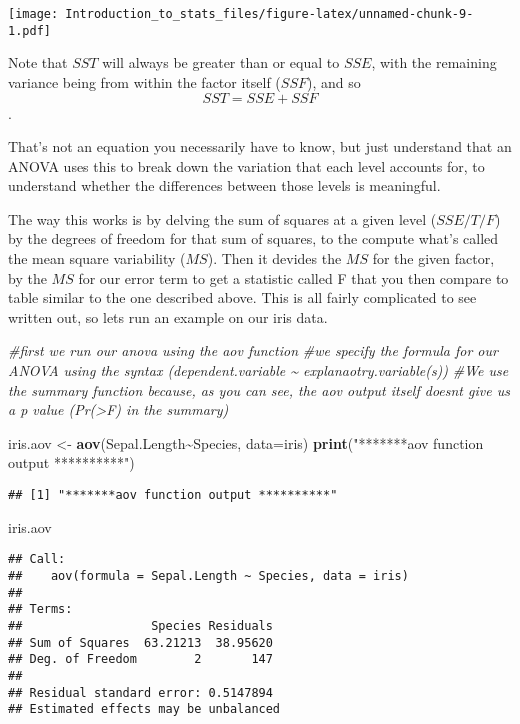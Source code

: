 \documentclass[
]{article}
\newenvironment{Shaded}{\begin{snugshade}}{\end{snugshade}}
\newcommand{\CommentTok}[1]{\textcolor[rgb]{0.56,0.35,0.01}{\textit{#1}}}
\newcommand{\DataTypeTok}[1]{\textcolor[rgb]{0.13,0.29,0.53}{#1}}
\newcommand{\KeywordTok}[1]{\textcolor[rgb]{0.13,0.29,0.53}{\textbf{#1}}}
\newcommand{\NormalTok}[1]{#1}
\newcommand{\OperatorTok}[1]{\textcolor[rgb]{0.81,0.36,0.00}{\textbf{#1}}}
\newcommand{\StringTok}[1]{\textcolor[rgb]{0.31,0.60,0.02}{#1}}
\begin{document}
\texttt{[image: Introduction\_to\_stats\_files/figure-latex/unnamed-chunk-9-1.pdf]}

Note that \(SST\) will always be greater than or equal to \(SSE\), with
the remaining variance being from within the factor itself (\(SSF\)),
and so \[SST=SSE+SSF\].

That's not an equation you necessarily have to know, but just understand
that an ANOVA uses this to break down the variation that each level
accounts for, to understand whether the differences between those levels
is meaningful.

The way this works is by delving the sum of squares at a given level
(\(SSE/T/F\)) by the degrees of freedom for that sum of squares, to the
compute what's called the mean square variability (\(MS\)). Then it
devides the \(MS\) for the given factor, by the \(MS\) for our error
term to get a statistic called F that you then compare to table similar
to the one described above. This is all fairly complicated to see
written out, so lets run an example on our iris data.

\begin{Shaded}
\begin{Highlighting}[]
\CommentTok{\#first we run our anova using the aov function}
\CommentTok{\#we specify the formula for our ANOVA using the syntax (dependent.variable \textasciitilde{} explanaotry.variable(s))}
\CommentTok{\#We use the summary function because, as you can see, the aov output itself doesn\textquotesingle{}t give us a p value (Pr(\textgreater{}F) in the summary)}

\NormalTok{iris.aov \textless{}{-}}\StringTok{ }\KeywordTok{aov}\NormalTok{(Sepal.Length}\OperatorTok{\textasciitilde{}}\NormalTok{Species, }\DataTypeTok{data=}\NormalTok{iris)}
\KeywordTok{print}\NormalTok{(}\StringTok{"*******aov function output **********"}\NormalTok{)}
\end{Highlighting}
\end{Shaded}

\begin{verbatim}
## [1] "*******aov function output **********"
\end{verbatim}

\begin{Shaded}
\begin{Highlighting}[]
\NormalTok{iris.aov}
\end{Highlighting}
\end{Shaded}

\begin{verbatim}
## Call:
##    aov(formula = Sepal.Length ~ Species, data = iris)
## 
## Terms:
##                  Species Residuals
## Sum of Squares  63.21213  38.95620
## Deg. of Freedom        2       147
## 
## Residual standard error: 0.5147894
## Estimated effects may be unbalanced
\end{verbatim}
\end{document}
